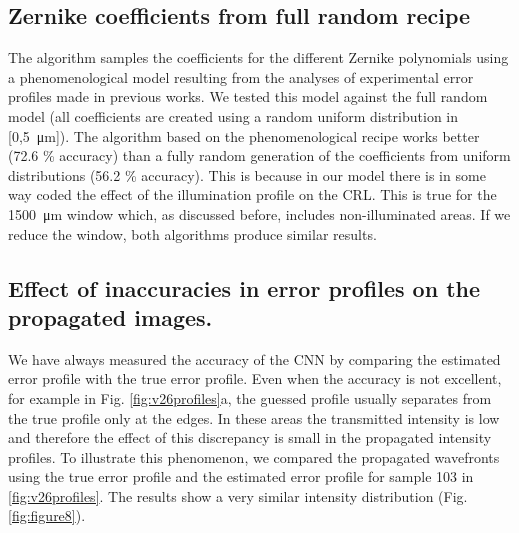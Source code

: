 \documentclass[preprint]{iucr}
\newcommand{\inred}[1]{{\color{red}#1}}
\begin{document}
\subsection{Zernike coefficients from full random recipe}
The algorithm samples the coefficients for the different Zernike polynomials using a phenomenological model resulting from the analyses of experimental error profiles made in previous works. We tested this model against the full random model (all  coefficients are created using a random uniform distribution in [0,\SI{5}{\micro\meter}]). The algorithm based on the phenomenological recipe works better (\inred{72.6 \%} accuracy) than a fully random generation of the coefficients from uniform distributions (\inred{56.2 \%} accuracy). This is because in our model there is in some way coded the effect of the illumination profile on the CRL. This is true for the \SI{1500}{\micro\meter} window which, as discussed before, includes non-illuminated areas. If we reduce the window, both algorithms produce similar results. 

\subsection{Effect of inaccuracies in error profiles on the propagated images.}
We have always measured the accuracy of the CNN by comparing the \inred{estimated} error profile with the true error profile. Even when the accuracy is not excellent, for example in Fig. \ref{fig:v26profiles}a, the guessed profile usually separates from the true profile only at the edges. In these areas the transmitted intensity is low and therefore the effect of this discrepancy is small in the propagated intensity profiles. To illustrate this phenomenon, we compared the propagated wavefronts using the true error profile and the \inred{estimated} error profile for sample 103 in \ref{fig:v26profiles}. The results show a very similar intensity distribution (Fig. \ref{fig:figure8}).
\end{document}
